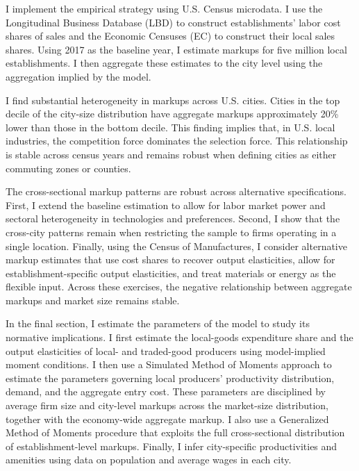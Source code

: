 I implement the empirical strategy using U.S. Census microdata. I use the Longitudinal Business Database (LBD) to construct establishments’ labor cost shares of sales and the Economic Censuses (EC) to construct their local sales shares. Using 2017 as the baseline year, I estimate markups for five million local establishments. I then aggregate these estimates to the city level using the aggregation implied by the model.

I find substantial heterogeneity in markups across U.S. cities. Cities in the top decile of the city-size distribution have aggregate markups approximately 20\% lower than those in the bottom decile. This finding implies that, in U.S. local industries, the competition force dominates the selection force. This relationship is stable across census years and remains robust when defining cities as either commuting zones or counties. 

The cross-sectional markup patterns are robust across alternative specifications. First, I extend the baseline estimation to allow for labor market power and sectoral heterogeneity in technologies and preferences. Second, I show that the cross-city patterns remain when restricting the sample to firms operating in a single location. Finally, using the Census of Manufactures, I consider alternative markup estimates that use cost shares to recover output elasticities, allow for establishment-specific output elasticities, and treat materials or energy as the flexible input. Across these exercises, the negative relationship between aggregate markups and market size remains stable.

In the final section, I estimate the parameters of the model to study its normative implications. I first estimate the local-goods expenditure share and the output elasticities of local- and traded-good producers using model-implied moment conditions. I then use a Simulated Method of Moments approach to estimate the parameters governing local producers’ productivity distribution, demand, and the aggregate entry cost. These parameters are disciplined by average firm size and city-level markups across the market-size distribution, together with the economy-wide aggregate markup. I also use a Generalized Method of Moments procedure that exploits the full cross-sectional distribution of establishment-level markups. Finally, I infer city-specific productivities and amenities using data on population and average wages in each city.

